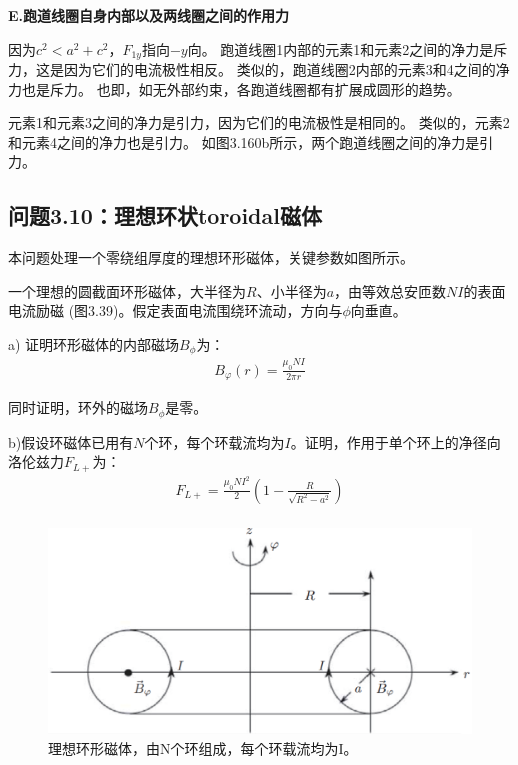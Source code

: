 \textbf{E.跑道线圈自身内部以及两线圈之间的作用力}

因为$c^2 < a^2+c^2$，$F_{1y}$指向$-y$向。
跑道线圈1内部的元素1和元素2之间的净力是斥力，这是因为它们的电流极性相反。
类似的，跑道线圈2内部的元素3和4之间的净力也是斥力。
也即，如无外部约束，各跑道线圈都有扩展成圆形的趋势。

元素1和元素3之间的净力是引力，因为它们的电流极性是相同的。
类似的，元素2和元素4之间的净力也是引力。
如图3.160b所示，两个跑道线圈之间的净力是引力。



\subsection{问题3.10：理想环状toroidal磁体}
本问题处理一个零绕组厚度的理想环形磁体，关键参数如图所示。

一个理想的圆截面环形磁体，大半径为$R$、小半径为$a$，由等效总安匝数$NI$的表面电流励磁
(图3.39)。假定表面电流围绕环流动，方向与$\phi$向垂直。

a) 证明环形磁体的内部磁场$B_\phi$为：
\begin{align}
B_{\varphi}(r)=\frac{\mu_{0}NI}{2\pi r}%
\end{align}

同时证明，环外的磁场$B_\phi$是零。

b)假设环磁体已用有$N$个环，每个环载流均为$I$。证明，作用于单个环上的净径向洛伦兹力$F_{L+}$为：
\begin{align}
F_{L+}=\frac{\mu_{0}NI^{2}}{2}(1-\frac{R}{\sqrt{R^{2}-a^{2}}})\\%
\end{align}
\begin{figure}[htbp]
	\centering
	\includegraphics[scale=0.5]{chpt3/figs/fig3.39.eps}
	\caption{理想环形磁体，由N个环组成，每个环载流均为I。}
\end{figure}

